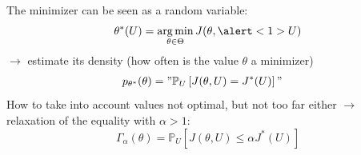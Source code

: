 \message{ !name(slides_laurent.tex)}\documentclass[11pt]{beamer}
\newcommand{\Prob}{\mathbb{P}}
\DeclareMathOperator*{\argmin}{arg\,min}
\newcommand{\kk}{\theta}
\newcommand{\uu}{u}
\newcommand{\UU}{U}
\newcommand{\Kspace}{\Theta}
\begin{document}
{  
      The minimizer can be seen as a random variable:
      \begin{equation*}
        \kk^*(\UU) = \argmin_{\kk\in\Kspace} J(\kk,\alert<1>{\UU})
      \end{equation*}
      $\longrightarrow$ estimate its density (how often is the value $\kk$ a minimizer)
      \begin{align*}
        p_{\kk^*}(\kk)%
                                               &= "\Prob_{\UU}\left[J(\kk,\UU)= J^*(\UU) \right]"                                               %
      \end{align*}
      \pause
      How to take into account values not optimal, but not too far either
      $\longrightarrow$ relaxation of the equality with $\alpha> 1$:
      \begin{equation*}
        \Gamma_{\alpha}(\kk) = \Prob_{\UU}\left[J(\kk,\UU) \leq \alpha J^*(\UU) \right]
      \end{equation*}
}
\end{document}
